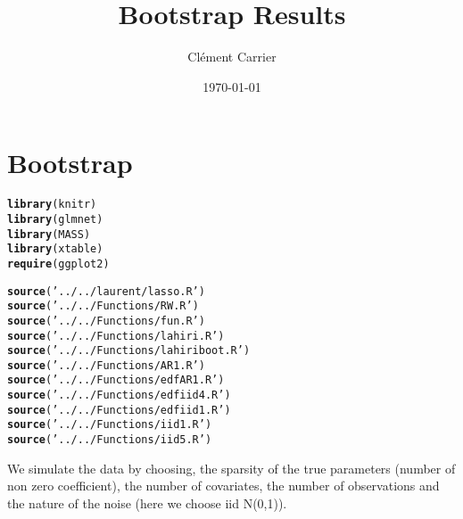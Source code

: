 \documentclass[11pt,oneside, a4paper]{amsart}\usepackage[]{graphicx}\usepackage[]{color}
\makeatletter
\newcommand{\hlstr}[1]{\textcolor[rgb]{0.192,0.494,0.8}{#1}}%
\newcommand{\hlstd}[1]{\textcolor[rgb]{0.345,0.345,0.345}{#1}}%
\newcommand{\hlkwd}[1]{\textcolor[rgb]{0.737,0.353,0.396}{\textbf{#1}}}%
\newenvironment{kframe}{%
 \def\at@end@of@kframe{}%
 \ifinner\ifhmode%
  \def\at@end@of@kframe{\end{minipage}}%
  \begin{minipage}{\columnwidth}%
 \fi\fi%
 \def\FrameCommand##1{\hskip\@totalleftmargin \hskip-\fboxsep
 \colorbox{shadecolor}{##1}\hskip-\fboxsep
     \hskip-\linewidth \hskip-\@totalleftmargin \hskip\columnwidth}%
 \MakeFramed {\advance\hsize-\width
   \@totalleftmargin\z@ \linewidth\hsize
   \@setminipage}}%
 {\par\unskip\endMakeFramed%
 \at@end@of@kframe}
\newenvironment{knitrout}{}{} %
\makeatother
\begin{document}
  
\title{Bootstrap Results}   
\author{Clément Carrier}
\date{\today}
\maketitle


\section*{Bootstrap}


\begin{knitrout}
\color{fgcolor}\begin{kframe}
\begin{alltt}
\hlkwd{library}\hlstd{(knitr)}
\hlkwd{library}\hlstd{(glmnet)}
\hlkwd{library}\hlstd{(MASS)}
\hlkwd{library}\hlstd{(xtable)}
\hlkwd{require}\hlstd{(ggplot2)}
\end{alltt}
\end{kframe}
\end{knitrout}




\begin{knitrout}
\color{fgcolor}\begin{kframe}
\begin{alltt}
\hlkwd{source}\hlstd{(}\hlstr{'../../laurent/lasso.R'}\hlstd{)}
\hlkwd{source}\hlstd{(}\hlstr{'../../Functions/RW.R'}\hlstd{)}
\hlkwd{source}\hlstd{(}\hlstr{'../../Functions/fun.R'}\hlstd{)}
\hlkwd{source}\hlstd{(}\hlstr{'../../Functions/lahiri.R'}\hlstd{)}
\hlkwd{source}\hlstd{(}\hlstr{'../../Functions/lahiriboot.R'}\hlstd{)}
\hlkwd{source}\hlstd{(}\hlstr{'../../Functions/AR1.R'}\hlstd{)}
\hlkwd{source}\hlstd{(}\hlstr{'../../Functions/edfAR1.R'}\hlstd{)}
\hlkwd{source}\hlstd{(}\hlstr{'../../Functions/edfiid4.R'}\hlstd{)}
\hlkwd{source}\hlstd{(}\hlstr{'../../Functions/edfiid1.R'}\hlstd{)}
\hlkwd{source}\hlstd{(}\hlstr{'../../Functions/iid1.R'}\hlstd{)}
\hlkwd{source}\hlstd{(}\hlstr{'../../Functions/iid5.R'}\hlstd{)}
\end{alltt}
\end{kframe}
\end{knitrout}


We simulate the data by choosing, the sparsity of the true parameters (number of non zero coefficient), the number of covariates, the number of observations and the nature of the noise (here we choose iid N(0,1)). 
\end{document}
